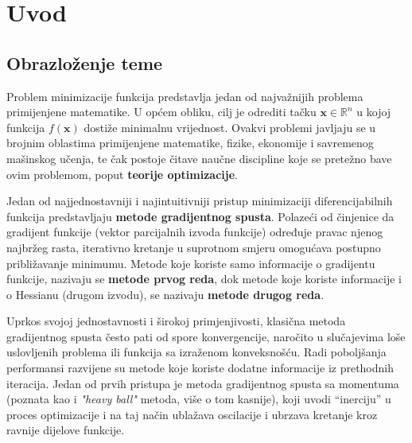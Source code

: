\chapter{Uvod}

\section{Obrazloženje teme}










Problem minimizacije funkcija predstavlja jedan od najvažnijih problema primijenjene matematike. U općem obliku, cilj je odrediti tačku
\(\mathbf{x}  \in \mathbb{R} ^n\) u kojoj funkcija \(f(\mathbf{x})\) dostiže minimalnu vrijednost.
Ovakvi problemi javljaju se u brojnim oblastima primijenjene matematike, fizike, ekonomije i savremenog mašinskog učenja, te čak postoje čitave naučne discipline koje se pretežno bave ovim problemom, poput \textbf{teorije optimizacije}.

Jedan od najjednostavniji i najintuitivniji pristup minimizaciji diferencijabilnih funkcija predstavljaju \textbf{metode gradijentnog spusta}.
Polazeći od činjenice da gradijent funkcije (vektor parcijalnih izvoda funkcije) određuje pravac njenog najbržeg rasta, iterativno kretanje u suprotnom smjeru omogućava postupno približavanje minimumu.
Metode koje koriste samo informacije o gradijentu funkcije, nazivaju se \textbf{metode prvog reda}, dok metode koje koriste informacije i o Hessianu (drugom izvodu), se nazivaju \textbf{metode drugog reda}.

Uprkos svojoj jednostavnosti i širokoj primjenjivosti, klasična metoda gradijentnog spusta često pati od spore konvergencije, naročito u slučajevima loše uslovljenih problema ili funkcija sa izraženom konveksnošću.
Radi poboljšanja performansi razvijene su metode koje koriste dodatne informacije iz prethodnih iteracija. Jedan od prvih pristupa je metoda gradijentnog spusta sa momentuma (poznata kao i \textit{"heavy ball"} metoda, više o tom kasnije), koji uvodi “inerciju” u proces optimizacije i na taj način ublažava oscilacije i ubrzava kretanje kroz ravnije dijelove funkcije.

